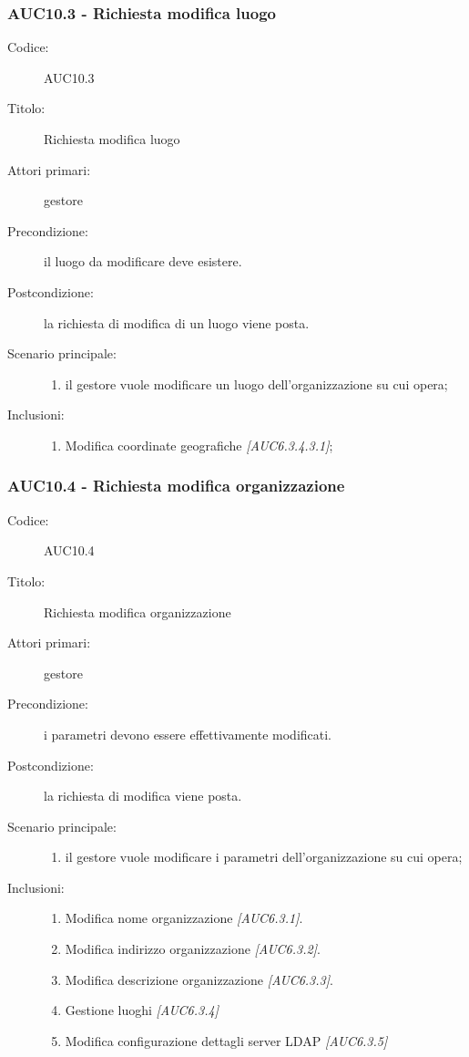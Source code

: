 \documentclass[casi-duso]{subfiles}
\begin{document}
\subsubsection{AUC10.3 - Richiesta modifica luogo}%
\label{subsub:AUC10.3}
\begin{description}
  \item[Codice:] AUC10.3
  \item[Titolo:] Richiesta modifica luogo
  \item[Attori primari:] gestore
  \item[Precondizione:] il luogo da modificare deve esistere.
  \item[Postcondizione:] la richiesta di modifica di un luogo viene posta.
  \item[Scenario principale:]
  \begin{enumerate}
    \item il gestore vuole modificare un luogo dell'organizzazione su cui opera;
  \end{enumerate}
  \item[Inclusioni:]
  \begin{enumerate}
    \item Modifica coordinate geografiche \emph{[AUC6.3.4.3.1]};
  \end{enumerate}
\end{description}

\subsubsection{AUC10.4 - Richiesta modifica organizzazione}%
\label{subsub:AUC10.4}
\begin{description}
  \item[Codice:] AUC10.4
  \item[Titolo:] Richiesta modifica organizzazione
  \item[Attori primari:] gestore
  \item[Precondizione:] i parametri devono essere effettivamente modificati.
  \item[Postcondizione:] la richiesta di modifica viene posta.
  \item[Scenario principale:]
  \begin{enumerate}
    \item il gestore vuole modificare i parametri dell'organizzazione su cui opera;
  \end{enumerate}
  \item[Inclusioni:]
  \begin{enumerate}
    \item Modifica nome organizzazione \emph{[AUC6.3.1]}.
    \item Modifica indirizzo organizzazione \emph{[AUC6.3.2]}.
    \item Modifica descrizione organizzazione \emph{[AUC6.3.3]}.
    \item Gestione luoghi \emph{[AUC6.3.4]} 
    \item Modifica configurazione dettagli server LDAP \emph{[AUC6.3.5]} 
  \end{enumerate}
\end{description}
\end{document}
